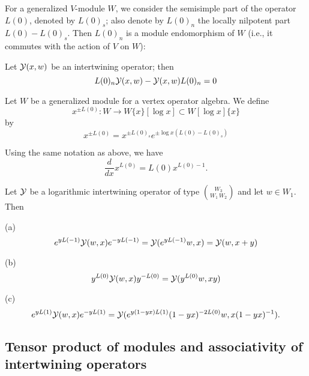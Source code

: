 \documentclass[12pt]{article}
\begin{document}
For a generalized $V$-module $W$, we consider the semisimple part of the
operator $L(0)$, denoted by $L(0)_s$; also denote by $L(0)_n$ the locally
nilpotent part $L(0) - L(0)_s$. Then $L(0)_n$ is a module endomorphism of
$W$ (i.e., it commutes with the action of $V$ on $W$):
\begin{lemma}
Let $\mathcal{Y}(x,w)$ be an intertwining operator; then
$$L(0)_n\mathcal{Y}(x,w) - \mathcal{Y}(x,w)L(0)_n = 0$$
\end{lemma}
\begin{defn} {\rm Let $W$ be a generalized module for a vertex operator
algebra. We define
$$ x^{\pm L(0)}: W\to W\{x\}[\log x]\subset W[\log x]\{x\}$$
by
\begin{equation*}
x^{\pm L(0)} = x^{\pm L(0)_s}e^{\pm \log x (L(0)-L(0)_s)}
\end{equation*}
}
\end{defn}

\begin{lemma}\label{x-L-0-derivative}
  Using the same notation as above, we have
  \begin{equation*}
    \frac{d}{dx} x^{L(0)} = L(0)x^{L(0)-1}.
  \end{equation*}
\end{lemma}

\begin{prop}
  Let ${\cal Y}$ be a logarithmic intertwining operator of type
  $\binom{W_3}{W_1\,W_2}$ and let $w\in W_1$. Then
  \begin{description}
    \item{(a)}
    \begin{equation*}
      e^{yL(-1)}{\cal Y}(w,x)e^{-yL(-1)}={\cal Y}(e^{yL(-1)}w,x)={\cal Y}(w,x+y)
    \end{equation*}
    \item{(b)}
    \begin{equation*}
      y^{L(0)}{\cal Y}(w,x)y^{-L(0)}={\cal Y}(y^{L(0)}w,xy)
    \end{equation*}
    \item{(c)}
    \begin{equation*}
      e^{yL(1)}{\cal Y}(w,x)e^{-yL(1)}={\cal
      Y}(e^{y(1-yx)L(1)}(1-yx)^{-2L(0)}w,x(1-yx)^{-1}).
    \end{equation*}
  \end{description}
\end{prop}

\subsection{Tensor product of modules and associativity of intertwining operators}
\label{s-tensor}
\end{document}
